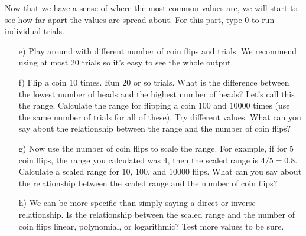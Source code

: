 \documentclass[11pt]{article}
\newif\ifsolutions
\begin{document}
\begin{enumerate}
\begin{enumerate}
\ifsolutions
{\color{blue}{Solution: The most common value should be $n/2$ for a sufficient number of trials. If we flip a coin twice ($n=2$), the options are HH, HT, TH, and TT. So half the time we should see the most common value be $1$ Head.
}}
\fi

\end{enumerate}
Now that we have a sense of where the most common values are, we will start to see how far apart the values are spread about. For this part, type $0$ to run individual trials. 
\begin{enumerate}
\item[e)] Play around with different number of coin flips and trials. We recommend using at most $20$ trials so it's easy to see the whole output.

\item[f)] Flip a coin $10$ times. Run $20$ or so trials. What is the difference between the lowest number of heads and the highest number of heads? Let's call this the range. Calculate the range for flipping a coin $100$ and $10000$ times (use the same number of trials for all of these). Try different values. What can you say about the relationship between the range and the number of coin flips?

\ifsolutions
{\color{blue}{Solution: For $10$ coin flips, an example range might be $8-3=5$. For $100$ coin flips, an example range might be $61-40=21$. For $10000$ coin flips an example range might be $5088-4894=194$. We can see that it increases as we flip more coins, even with the same number of trials.
}}

\begin{figure}
\centering
\texttt{[image: resources/trial\_8\_20.png]}
\caption{Trial run with 8 flips and 20 trials.}
\end{figure}
\fi

\item[g)] Now use the number of coin flips to scale the range. For example, if for $5$ coin flips, the range you calculated was $4$, then the scaled range is $4/5=0.8$. Calculate a scaled range for $10$, $100$, and $10000$ flips. What can you say about the relationship between the scaled range and the number of coin flips?

\ifsolutions
{\color{blue}{Solution: Our scaled ranges above would be $5/10=0.5$, $21/100=0.21$, $194/10000=0.0194$, which decrease with the number of flips.}}
\fi

\item[h)] We can be more specific than simply saying a direct or inverse relationship. Is the relationship between the scaled range and the number of coin flips linear, polynomial, or logarithmic? Test more values to be sure.


\end{enumerate}
\end{enumerate}
\end{document}
